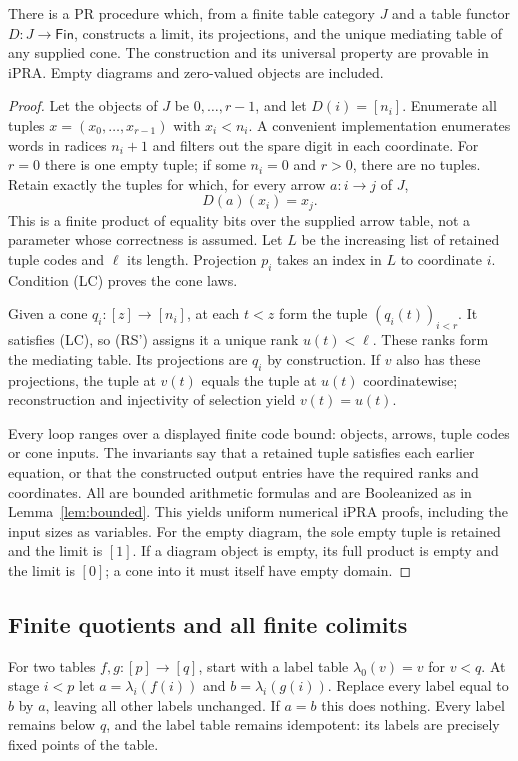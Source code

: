 \begin{theorem}\label{thm:finite-limit}
There is a PR procedure which, from a finite table category $J$ and a
table functor $D:J\to\mathsf{Fin}$, constructs a limit, its projections,
and the unique mediating table of any supplied cone. The construction
and its universal property are provable in iPRA. Empty diagrams and
zero-valued objects are included.
\end{theorem}
\begin{proof}
Let the objects of $J$ be $0,\ldots,r-1$, and let $D(i)=[n_i]$. Enumerate
all tuples $x=(x_0,\ldots,x_{r-1})$ with $x_i<n_i$. A convenient
implementation enumerates words in radices $n_i+1$ and filters out the
spare digit in each coordinate. For $r=0$ there is one empty tuple; if
some $n_i=0$ and $r>0$, there are no tuples.
Retain exactly the tuples for which, for every arrow $a:i\to j$ of $J$,
\[
                         D(a)(x_i)=x_j.                     \tag{LC}
\]
This is a finite product of equality bits over the supplied arrow table,
not a parameter whose correctness is assumed. Let $L$ be the increasing
list of retained tuple codes and $\ell$ its length. Projection $p_i$ takes
an index in $L$ to coordinate $i$. Condition (LC) proves the cone laws.

Given a cone $q_i:[z]\to[n_i]$, at each $t<z$ form the tuple
$(q_i(t))_{i<r}$. It satisfies (LC), so (RS') assigns it a unique rank
$u(t)<\ell$. These ranks form the mediating table. Its projections are
$q_i$ by construction. If $v$ also has these projections, the tuple at
$v(t)$ equals the tuple at $u(t)$ coordinatewise; reconstruction and
injectivity of selection yield $v(t)=u(t)$.

Every loop ranges over a displayed finite code bound: objects, arrows,
tuple codes or cone inputs. The invariants say that a retained tuple
satisfies each earlier equation, or that the constructed output entries
have the required ranks and coordinates. All are bounded arithmetic
formulas and are Booleanized as in Lemma~\ref{lem:bounded}. This yields
uniform numerical iPRA proofs, including the input sizes as variables.
For the empty diagram, the sole empty tuple is retained and the limit
is $[1]$. If a diagram object is empty, its full product is empty and
the limit is $[0]$; a cone into it must itself have empty domain.
\end{proof}

\subsection{Finite quotients and all finite colimits}
For two tables $f,g:[p]\to[q]$, start with a label table
$\lambda_0(v)=v$ for $v<q$. At stage $i<p$ let
$a=\lambda_i(f(i))$ and $b=\lambda_i(g(i))$. Replace every label equal
to $b$ by $a$, leaving all other labels unchanged. If $a=b$ this does
nothing. Every label remains below $q$, and the label table remains
idempotent: its labels are precisely fixed points of the table.

